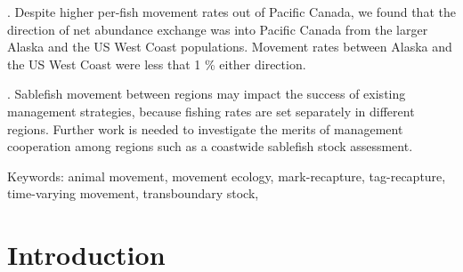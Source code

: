 \documentclass{article}
\begin{document}
. Despite higher per-fish movement rates out of Pacific Canada, we found that the direction of net abundance exchange was into Pacific Canada from the larger Alaska and the US West Coast populations. Movement rates between Alaska and the US West Coast were less that \num{1} \% either direction.

. Sablefish movement between regions may impact the success of existing management strategies, because fishing rates are set separately in different regions. Further work is needed to investigate the merits of management cooperation among regions such as a coastwide sablefish stock assessment.

\vspace{5mm}
\noindent Keywords: animal movement, movement ecology, mark-recapture, tag-recapture, time-varying movement, transboundary stock,

\section{Introduction}

\end{document}

